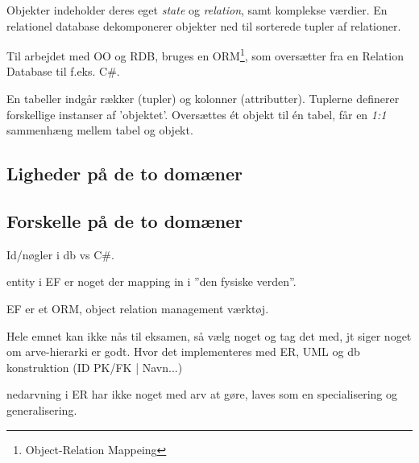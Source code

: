 Objekter indeholder deres eget \textit{state} og \textit{relation}, samt komplekse værdier. En relationel database dekomponerer objekter ned til sorterede tupler af relationer.

Til arbejdet med OO og RDB, bruges en ORM\footnote{Object-Relation Mappeing}, som oversætter fra en Relation Database til f.eks. C\#.

En tabeller indgår rækker (tupler) og kolonner (attributter). 
Tuplerne definerer forskellige instanser af 'objektet'. Oversættes ét objekt til én tabel, får en \textit{1:1} sammenhæng mellem tabel og objekt.




\subsection{Ligheder på de to domæner}


\subsection{Forskelle på de to domæner}
Id/nøgler i db vs C\#. 


entity i EF er noget der mapping in i ''den fysiske verden''.

EF er et ORM, object relation management værktøj.

Hele emnet kan ikke nås til eksamen, så vælg noget og tag det med, jt siger noget om arve-hierarki er godt. Hvor det implementeres med ER, UML og db konstruktion (ID PK/FK | Navn...)

nedarvning i ER har ikke noget med arv at gøre, laves som en specialisering og generalisering.
